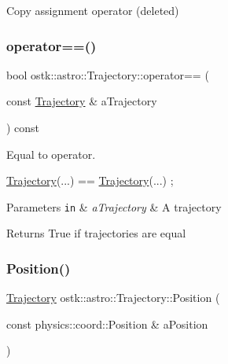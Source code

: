 Copy assignment operator (deleted) 

\mbox{\label{classostk_1_1astro_1_1_trajectory_a13b1a0621195ed85aa3df0da5ae935f2}} 
\subsubsection{\texorpdfstring{operator==()}{operator==()}}
{\footnotesize\ttfamily bool ostk\+::astro\+::\+Trajectory\+::operator== (\begin{DoxyParamCaption}\item[{const \hyperlink{classostk_1_1astro_1_1_trajectory}{Trajectory} \&}]{a\+Trajectory }\end{DoxyParamCaption}) const}



Equal to operator. 


\begin{DoxyCode}
\hyperlink{classostk_1_1astro_1_1_trajectory_a9333200bd6afed5aef4f5aad8a2a8e84}{Trajectory}(...) == \hyperlink{classostk_1_1astro_1_1_trajectory_a9333200bd6afed5aef4f5aad8a2a8e84}{Trajectory}(...) ;
\end{DoxyCode}



\begin{DoxyParams}[1]{Parameters}
\mbox{\tt in}  & {\em a\+Trajectory} & A trajectory \\
\hline
\end{DoxyParams}
\begin{DoxyReturn}{Returns}
True if trajectories are equal 
\end{DoxyReturn}
\mbox{\label{classostk_1_1astro_1_1_trajectory_ae98d1466450030f73a83567c8cc1471a}} 
\subsubsection{\texorpdfstring{Position()}{Position()}}
{\footnotesize\ttfamily \hyperlink{classostk_1_1astro_1_1_trajectory}{Trajectory} ostk\+::astro\+::\+Trajectory\+::\+Position (\begin{DoxyParamCaption}\item[{const physics\+::coord\+::\+Position \&}]{a\+Position }\end{DoxyParamCaption})\hspace{0.3cm}{\ttfamily [static]}}



